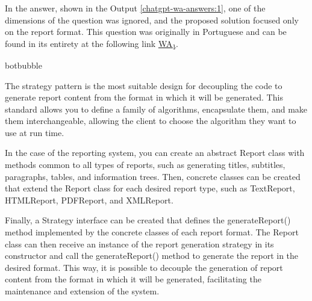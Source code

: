 In the answer, shown in the Output \ref{chatgpt-wa-answers:1}, one of the dimensions of the question was ignored, and the proposed solution focused only on the report format. This question was originally in Portuguese and can be found in its entirety at the following link  \href{https://chat.openai.com/share/9fca7359-3a95-4032-83a9-f03b45cea436}{WA\textsubscript{1}}.
\begin{chatout}{botbubble}{}

The strategy pattern is the most suitable design for decoupling the code to generate report content from the format in which it will be generated. This standard allows you to define a family of algorithms, encapsulate them, and make them interchangeable, allowing the client to choose the algorithm they want to use at run time. 

In the case of the reporting system, you can create an abstract Report class with methods common to all types of reports, such as generating titles, subtitles, paragraphs, tables, and information trees. Then, concrete classes can be created that extend the Report class for each desired report type, such as TextReport, HTMLReport, PDFReport, and XMLReport.

Finally, a Strategy interface can be created that defines the generateReport() method implemented by the concrete classes of each report format. The Report class can then receive an instance of the report generation strategy in its constructor and call the generateReport() method to generate the report in the desired format. This way, it is possible to decouple the generation of report content from the format in which it will be generated, facilitating the maintenance and extension of the system.
\end{chatout}
   
